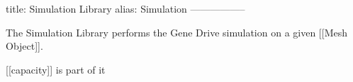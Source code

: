 title: Simulation Library
alias: Simulation
-----------------

The Simulation Library performs the Gene Drive simulation on a given [[Mesh Object]].

[[capacity]] is part of it
